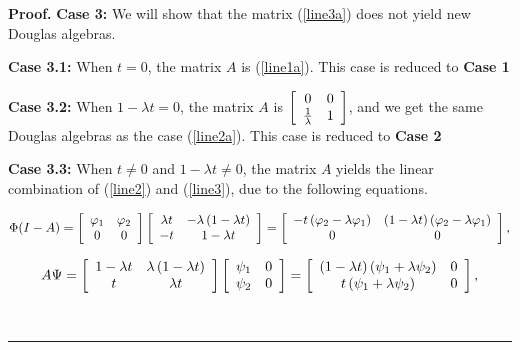 \documentclass{article}%
\newenvironment{proof}[1][Proof]{\noindent\textbf{#1.} }{\ \rule{0.5em}{0.5em}}
\begin{document}
\begin{proof}
\textbf{{Case 3:}} We will show that the matrix (\ref{line3a}) does not yield
new Douglas algebras.

\textbf{{Case 3.1:}} When $t=0$, the matrix $A$ is (\ref{line1a}). This case
is reduced to \textbf{{Case 1}}

\textbf{{Case 3.2:}} When $1-\lambda t=0$, the matrix $A$ is $\left[
\begin{array}
[c]{cc}%
0 & 0\\
\frac{1}{\lambda} & 1
\end{array}
\right]  $, and we get the same Douglas algebras as the case (\ref{line2a}).
This case is reduced to \textbf{{Case 2}}

\textbf{{Case 3.3:}} When $t\neq0$ and $1-\lambda t\neq0$, the matrix $A$
yields the linear combination of (\ref{line2}) and (\ref{line3}), due to the
following equations.%

\begin{align}
\Phi(I-A)=\left[
\begin{array}
[c]{cc}%
\varphi_{1} & \varphi_{2}\\
0 & 0
\end{array}
\right]  \left[
\begin{array}
[c]{cc}%
\lambda t & -\lambda\left(  1-\lambda t\right) \\
-t & 1-\lambda t
\end{array}
\right]  =\left[
\begin{array}
[c]{cc}%
-t\left(  \varphi_{2}-\lambda\varphi_{1}\right)  & \left(  1-\lambda t\right)
\left(  \varphi_{2}-\lambda\varphi_{1}\right) \\
0 & 0
\end{array}
\right]  ,\nonumber
\end{align}
%

\begin{align}
A\Psi= \left[
\begin{array}
[c]{cc}%
1-\lambda t & \lambda\left(  1-\lambda t\right) \\
t & \lambda t
\end{array}
\right]  \left[
\begin{array}
[c]{cc}%
\psi_{1} & 0\\
\psi_{2} & 0
\end{array}
\right]  =\left[
\begin{array}
[c]{cc}%
\left(  1-\lambda t\right)  \left(  \psi_{1}+\lambda\psi_{2}\right)  & 0\\
t\left(  \psi_{1}+\lambda\psi_{2}\right)  & 0
\end{array}
\right]  ,\nonumber
\end{align}
%


\end{proof}
\end{document}
